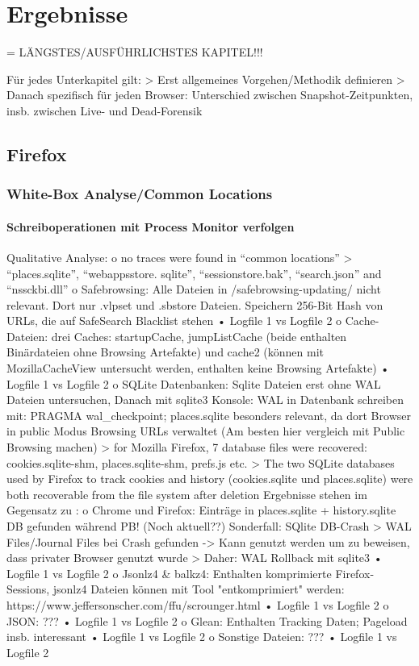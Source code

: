 \chapter{Ergebnisse}

= LÄNGSTES/AUSFÜHRLICHSTES KAPITEL!!!

Für jedes Unterkapitel gilt: 
> Erst allgemeines Vorgehen/Methodik definieren
> Danach spezifisch für jeden Browser: Unterschied zwischen Snapshot-Zeitpunkten, insb. zwischen Live- und Dead-Forensik

\section{Firefox}

\subsection*{White-Box Analyse/Common Locations}

\subsubsection*{Schreiboperationen mit Process Monitor verfolgen}

Qualitative Analyse:
	o no traces were found in “common locations” \cite{Montasari.2015}
		>  “places.sqlite”, “webappsstore. sqlite”, “sessionstore.bak”, “search.json” and “nssckbi.dll”
	o	Safebrowsing: Alle Dateien in /safebrowsing-updating/ nicht relevant. Dort nur .vlpset und .sbstore Dateien. Speichern 256-Bit Hash von URLs, die auf SafeSearch Blacklist stehen 
		•	Logfile 1 vs Logfile 2
	o	Cache-Dateien: drei Caches: startupCache, jumpListCache (beide enthalten Binärdateien ohne Browsing Artefakte) und cache2 (können mit MozillaCacheView untersucht werden, enthalten keine Browsing Artefakte)
		•	Logfile 1 vs Logfile 2
	o	SQLite Datenbanken: Sqlite Dateien erst ohne WAL Dateien untersuchen, Danach mit sqlite3 Konsole: WAL in Datenbank schreiben mit: PRAGMA wal\_checkpoint; places.sqlite besonders relevant, da dort Browser in public Modus Browsing URLs verwaltet (Am besten hier vergleich mit Public Browsing machen)	
		> \cite{Fayyad.2021} for Mozilla Firefox, 7 database files were recovered: cookies.sqlite-shm, places.sqlite-shm, prefs.js etc.
		> \cite{Muir.2019} The two SQLite databases used by Firefox to track cookies and history (cookies.sqlite und places.sqlite) were both recoverable from the file system after deletion	
		Ergebnisse stehen im Gegensatz zu \cite{Hedberg.2013} :
			o	Chrome und Firefox: Einträge in places.sqlite + history.sqlite DB gefunden während PB! (Noch aktuell??)
		Sonderfall: SQlite DB-Crash \cite{Hedberg.2013}
			> WAL Files/Journal Files bei Crash gefunden -> Kann genutzt werden um zu beweisen, dass privater Browser genutzt wurde
			> Daher: WAL Rollback mit sqlite3		
		•	Logfile 1 vs Logfile 2
	o	Jsonlz4 \& balkz4: Enthalten komprimierte Firefox-Sessions, jsonlz4 Dateien können mit Tool "entkomprimiert" werden: https://www.jeffersonscher.com/ffu/scrounger.html
		•	Logfile 1 vs Logfile 2
	o	JSON: ???
		•	Logfile 1 vs Logfile 2
	o	Glean: Enthalten Tracking Daten; Pageload insb. interessant
		•	Logfile 1 vs Logfile 2
	o	Sonstige Dateien: ???
		•	Logfile 1 vs Logfile 2

